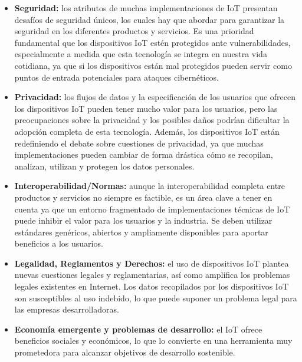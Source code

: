 \begin{itemize}
\item{\bf Seguridad: }los atributos de muchas implementaciones de IoT presentan \\ desafíos de seguridad únicos,  los cuales hay que abordar para garantizar la seguridad en los diferentes productos y servicios. Es una prioridad fundamental que los dispositivos IoT estén protegidos ante vulnerabilidades, especialmente a medida que esta tecnología se integra en nuestra vida cotidiana, ya que si los dispositivos están mal protegidos pueden servir como puntos de entrada potenciales para ataques cibernéticos.
\item{\bf Privacidad: }los flujos de datos y la especificación de los usuarios que ofrecen los dispositivos IoT pueden tener mucho valor para los usuarios, pero las preocupaciones sobre la privacidad y los posibles daños podrían dificultar la adopción completa de esta tecnología. Además, los dispositivos IoT están redefiniendo el debate sobre cuestiones de privacidad, ya que muchas implementaciones pueden cambiar de forma drástica cómo se recopilan, analizan, utilizan y protegen los datos personales.
\item{\bf Interoperabilidad/Normas: }aunque la interoperabilidad completa entre productos y servicios no siempre es factible, es un área clave a tener en cuenta ya que un entorno fragmentado de implementaciones técnicas de IoT puede inhibir el valor para los usuarios y la industria. Se deben utilizar estándares genéricos, abiertos y ampliamente disponibles para aportar beneficios a los usuarios.\clearpage
\item{\bf Legalidad, Reglamentos y Derechos: }el uso de dispositivos IoT plantea nuevas cuestiones legales y reglamentarias, así como amplifica los problemas legales existentes en Internet. Los datos recopilados por los dispositivos IoT son susceptibles al uso indebido, lo que puede suponer un problema legal para las empresas desarrolladoras.
\item{\bf Economía emergente y problemas de desarrollo: } el IoT ofrece beneficios sociales y económicos, lo que lo convierte en una herramienta muy prometedora para alcanzar objetivos de desarrollo sostenible.
\end{itemize}
\vspace{0.3cm}
